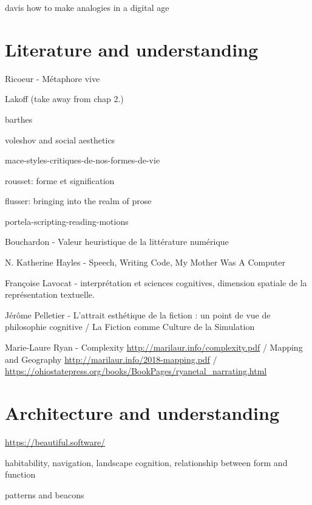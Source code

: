 davis how to make analogies in a digital age

\section{Literature and understanding}
\label{sec:aesthetic-literature}


Ricoeur - Métaphore vive

Lakoff (take away from chap 2.)

barthes 

voleshov and social aesthetics

mace-styles-critiques-de-nos-formes-de-vie

rousset: forme et signification

flusser: bringing into the realm of prose

portela-scripting-reading-motions


Bouchardon - Valeur heuristique de la littérature numérique

N. Katherine Hayles - Speech, Writing Code, My Mother Was A Computer


Françoise Lavocat - interprétation et sciences cognitives, dimension spatiale de la représentation textuelle.

Jérôme Pelletier -  L'attrait esthétique de la fiction : un point de vue de philosophie cognitive /  La Fiction comme Culture de la Simulation 

Marie-Laure Ryan - Complexity \url{http://marilaur.info/complexity.pdf} / Mapping and Geography \url{http://marilaur.info/2018-mapping.pdf} / \url{https://ohiostatepress.org/books/BookPages/ryanetal_narrating.html}

\section{Architecture and understanding}
\label{sec:arch-understanding}


\url{https://beautiful.software/}

habitability, navigation, landscape cognition, relationship between form and function

patterns and beacons

